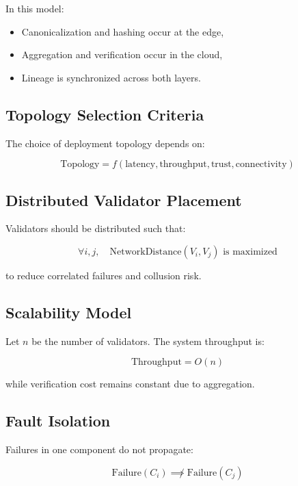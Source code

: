 In this model:
\begin{itemize}
\item Canonicalization and hashing occur at the edge,
\item Aggregation and verification occur in the cloud,
\item Lineage is synchronized across both layers.
\end{itemize}

\subsection{Topology Selection Criteria}

The choice of deployment topology depends on:

\begin{equation}
\text{Topology} = f(\text{latency}, \text{throughput}, \text{trust}, \text{connectivity})
\end{equation}

\subsection{Distributed Validator Placement}

Validators should be distributed such that:

\begin{equation}
\forall i,j, \quad \text{NetworkDistance}(V_i, V_j) \text{ is maximized}
\end{equation}

to reduce correlated failures and collusion risk.

\subsection{Scalability Model}

Let $n$ be the number of validators. The system throughput is:

\begin{equation}
\text{Throughput} = O(n)
\end{equation}

while verification cost remains constant due to aggregation.

\subsection{Fault Isolation}

Failures in one component do not propagate:

\begin{equation}
\text{Failure}(C_i) \not\implies \text{Failure}(C_j)
\end{equation}

